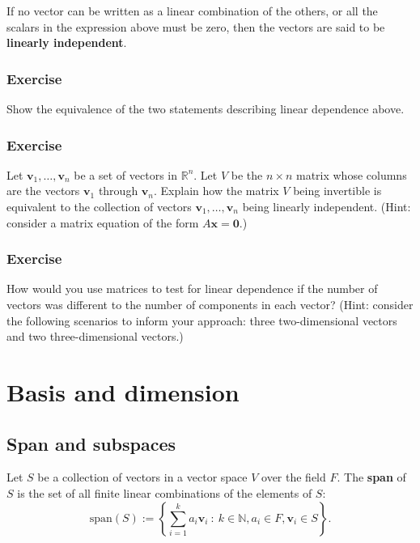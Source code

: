 \documentclass[a4paper,12pt]{amsart}
\begin{document}
    If no vector can be written as a linear combination of the others, or all the scalars in the expression above must be zero, then the vectors are said to be \textbf{linearly independent}.

    \subsubsection{Exercise} Show the equivalence of the two statements describing linear dependence above.

    \subsubsection{Exercise} Let $\mathbf{v}_1, \ldots, \mathbf{v}_n$ be a set of vectors in $\mathbb{R}^n$. Let $V$ be the $n \times n$ matrix whose columns are the vectors $\mathbf{v}_1$ through $\mathbf{v}_n$. Explain how the matrix $V$ being invertible is equivalent to the collection of vectors $\mathbf{v}_1, \ldots, \mathbf{v}_n$ being linearly independent. (Hint: consider a matrix equation of the form $A\mathbf{x} = \mathbf{0}$.)

    \subsubsection{Exercise} How would you use matrices to test for linear dependence if the number of vectors was different to the number of components in each vector? (Hint: consider the following scenarios to inform your approach: three two-dimensional vectors and two three-dimensional vectors.)

    \section{Basis and dimension}

    \subsection{Span and subspaces} Let $S$ be a collection of vectors in a vector space $V$ over the field $F$. The \textbf{span} of $S$ is the set of all finite linear combinations of the elements of $S$:
    \[ \mathrm{span} (S) := \left\{ \sum_{i=1}^k a_i \mathbf{v}_i \: : \: k \in \mathbb{N}, a_i \in F, \mathbf{v}_i \in S \right \}. \]
    
\end{document}
